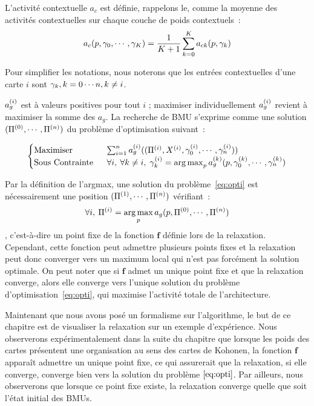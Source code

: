 \documentclass[../main]{subfiles}
\begin{document}
L'activité contextuelle $a_c$ est définie, rappelons le, comme la moyenne des activités contextuelles sur chaque couche de poids contextuels~:
\begin{equation}
	a_c(p, \gamma_0, \cdots, \gamma_K) = \frac{1}{K+1}\sum_{k=0}^{K}{a_{ck}(p, \gamma_k)}
\end{equation}

Pour simplifier les notations, nous noterons que les entrées contextuelles d'une carte $i$ sont ${\gamma_k, k = 0 \cdots n , k \neq i}$.

$a_g^{({i})}$ est à valeurs positives pour tout $i$ ; maximiser individuellement $a_g^{({i})}$ revient à maximiser la somme des $a_g$. 
La recherche de BMU s'exprime comme une solution $(\Pi^{({0})}, \cdots, \Pi^{({n})})$ du problème d'optimisation suivant~:

\begin{equation}\label{eq:opti}
	\begin{cases}
	\text{Maximiser}\;& \sum_{i = 1}^n a_g^{({i})}((\Pi^{({i})},X^{({i})},\gamma_0^{({i})}, \cdots, \gamma_n^{({i})})) \\
	\text{Sous Contrainte }\; &\forall i,\:\forall k \neq i, \; \gamma_k^{({i})} = \operatorname*{arg\,max}_{p}a_g^{({k})}(p,\gamma_0^{({k})}, \cdots, \gamma_n^{({k})})
	\end{cases}
\end{equation}

Par la définition de l'argmax, une solution du problème~\ref{eq:opti} est nécessairement une position $(\Pi^{({1})}, \cdots, \Pi^{({n})})$ vérifiant~:
$$\forall i, \: \Pi^{({i})} = \operatorname*{arg\,max}_p a_g(p, \Pi^{({0})}, \cdots, \Pi^{({n})})$$, c'est-à-dire un point fixe de la fonction $\mathbf{f}$ définie lors de la relaxation.
Cependant, cette fonction peut admettre plusieurs points fixes et la relaxation peut donc converger vers un maximum local qui n'est pas forcément la solution optimale.
On peut noter que si $\mathbf{f}$ admet un unique point fixe et que la relaxation converge, alors elle converge vers l'unique solution du problème d'optimisation~\ref{eq:opti}, qui maximise l'activité totale de l'architecture.

Maintenant que nous avons posé un formalisme sur l'algorithme, le but de ce chapitre est de visualiser la relaxation sur un exemple d'expérience.
Nous observerons expérimentalement dans la suite du chapitre que lorsque les poids des cartes présentent une organisation au sens des cartes de Kohonen, la fonction $\mathbf{f}$ apparaît admettre un unique point fixe, ce qui assurerait que la relaxation, si elle converge, converge bien vers la solution du problème $\ref{eq:opti}$. Par ailleurs, nous observerons que lorsque ce point fixe existe, la relaxation converge quelle que soit l'état initial des BMUs.
\end{document}
